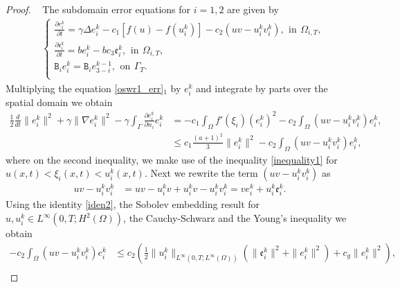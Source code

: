 \documentclass[10pt,a4paper]{amsart}
\begin{document}
\begin{proof}~
The subdomain error equations for $i=1, 2$ are given by
\begin{equation}\label{oswr1_err}
\begin{aligned}
&\left\{
\begin{aligned}
\frac{\partial e_i^{k}}{\partial t}  = \gamma \Delta e_i^{k} - c_1\left[ f(u)-f(u_i^{k})\right] - c_2\left( uv - u_i^{k}v_i^{k}\right), \,\ \text{in} \,\ \Omega_{i,T},\\
\frac{\partial \mathfrak{e}_i^{k}}{\partial t}  = be_i^{k} - bc_3\mathfrak{e}_i^{k} ,\,\ \text{in} \,\ \Omega_{i,T},  \\
\mathtt{B}_i e_i^{k}
 = 
\mathtt{B}_i e_{3-i}^{k-1},
\,\ \mbox{on}\,\ \Gamma_{T}.\\
\end{aligned}\right.
\end{aligned}
\end{equation}
Multiplying the equation \eqref{oswr1_err}$_1$ by $e_i^{k}$ and integrate by parts over the spatial domain we obtain 
\begin{equation}\label{err_est1}
\begin{aligned}
\frac{1}{2}\frac{d}{d t} \parallel e_i^{k}\parallel^2 + \gamma\parallel\nabla e_i^{k} \parallel^2 -\gamma\int_{\Gamma} \frac{\partial e_i^{k}}{\partial n_i} e_i^{k} & =- c_1 \int_{\Omega} f'(\xi_i) \left( e_i^{k}\right)^2 -c_2\int_{\Omega} \left( uv - u_i^{k}v_i^{k}\right)e_i^{k},\\
& \leq c_1\frac{(a+1)^2}{3} \parallel e_i^{k}\parallel^2 -c_2\int_{\Omega} \left( uv - u_i^{k}v_i^{k}\right)e_i^{k},
\end{aligned}
\end{equation}
where on the second inequality, we make use of the inequality \eqref{inequality1} for $u(x,t)< \xi_i(x,t)<u_i^{k}(x,t)$. Next we rewrite the term $\left( uv - u_i^{k}v_i^{k}\right)$ as
\begin{equation}\label{iden2}
\begin{aligned}
uv - u_i^{k}v_i^{k} & = uv- u_i^{k}v +u_i^{k}v -u_i^{k}v_i^{k} 
=  v {e}_i^{k} + u_i^{k} \mathfrak{e}_i^{k} .
\end{aligned}
\end{equation}
Using the identity \eqref{iden2}, the Sobolev embedding result for $u, u_i^{k}\in L^{\infty}(0, T; H^2(\Omega))$, the Cauchy-Schwarz and the Young's inequality we obtain 
\begin{equation}\label{err_int}
\begin{aligned}
-c_2\int_{\Omega} \left( uv - u_i^{k}v_i^{k}\right)e_i^{k} &\leq c_2\left( \frac{1}{2} \parallel u_i^{k}\parallel_{L^{\infty}(0,T;L^{\infty}(\Omega))} \left( \parallel \mathfrak{e}_i^{k}\parallel^2 + \parallel e_i^{k}\parallel^2 \right) + c_g \parallel e_i^{k}\parallel^2 \right),\\

\end{aligned}
\end{equation}
\end{proof}
\end{document}
